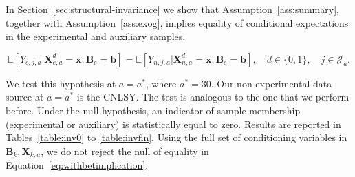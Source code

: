 \noindent In Section~\ref{sec:structural-invariance} we show that Assumption~\ref{ass:summary}, together with Assumption~\ref{ass:exog}, implies equality of conditional expectations in the experimental and auxiliary samples.

\begin{equation}\label{eq:withbetimplication}
\mathbb{E} \left[ Y_{e,j,a} | \bm{X}^d_{e,a} = \bm{x}, \bm{B}_e = \bm{b} \right] = \mathbb{E} \left[ Y_{n,j,a} | \bm{X}^d_{n,a} = \bm{x}, \bm{B}_e = \bm{b} \right], \quad d \in \{0,1\}, \quad j \in \mathcal{J}_a.
\end{equation}

\noindent We test this hypothesis at $a = a^*$, where $a^*=30$. Our non-experimental data source at $a = a^*$ is the CNLSY. The test is analogous to the one that we perform before. Under the null hypothesis, an indicator of sample membership (experimental or auxiliary) is statistically equal to zero. Results are reported in Tables~\ref{table:inv0} to \ref{table:invfin}. Using the full set of conditioning variables in $\bm{B}_k, \bm{X}_{k,a}$, we do not reject the null of equality in Equation~\eqref{eq:withbetimplication}.

